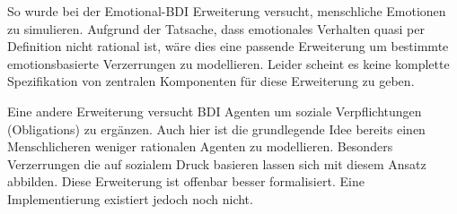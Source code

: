 So wurde bei der Emotional-BDI\cite{} %
Erweiterung versucht, menschliche Emotionen zu simulieren.
Aufgrund der Tatsache, dass emotionales Verhalten quasi per Definition nicht rational ist, wäre dies eine passende Erweiterung um bestimmte emotionsbasierte Verzerrungen zu modellieren.
Leider scheint es keine komplette Spezifikation von zentralen Komponenten für diese Erweiterung zu geben\cite[paragraph 4.16]{balke2014agents}.

Eine andere Erweiterung versucht BDI Agenten um soziale Verpflichtungen (Obligations) zu ergänzen.
Auch hier ist die grundlegende Idee bereits einen Menschlicheren weniger rationalen Agenten zu modellieren.
Besonders Verzerrungen die auf sozialem Druck basieren lassen sich mit diesem Ansatz abbilden.
Diese Erweiterung ist offenbar besser formalisiert.
Eine Implementierung existiert jedoch noch nicht\cite[stand 2015]{balke2014agents}.
